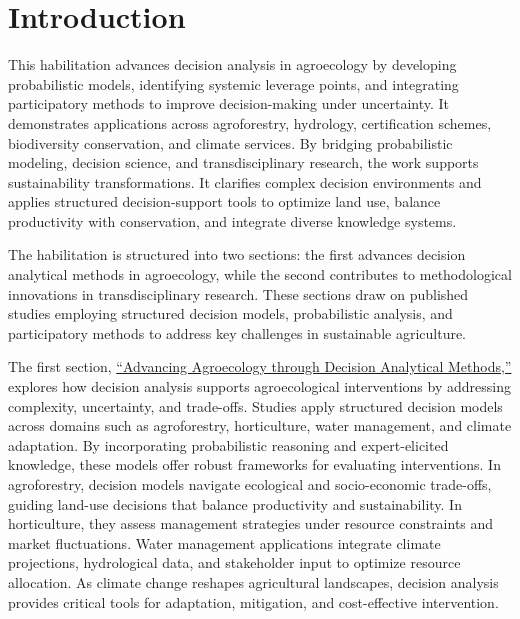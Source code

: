\documentclass[
]{article}
\begin{document}
\renewcommand{\thesection}{\arabic{section}}
\renewcommand{\thesubsection}{\thesection.\arabic{subsection}}

\newpage
{}

\hypertarget{introduction}{%
\section{Introduction}\label{introduction}}

This habilitation advances decision analysis in agroecology by
developing probabilistic models, identifying systemic leverage points,
and integrating participatory methods to improve decision-making under
uncertainty. It demonstrates applications across agroforestry,
hydrology, certification schemes, biodiversity conservation, and climate
services. By bridging probabilistic modeling, decision science, and
transdisciplinary research, the work supports sustainability
transformations. It clarifies complex decision environments and applies
structured decision-support tools to optimize land use, balance
productivity with conservation, and integrate diverse knowledge systems.

The habilitation is structured into two sections: the first advances
decision analytical methods in agroecology, while the second contributes
to methodological innovations in transdisciplinary research. These
sections draw on published studies employing structured decision models,
probabilistic analysis, and participatory methods to address key
challenges in sustainable agriculture.

The first section, \protect\hyperlink{chapter_one}{``Advancing
Agroecology through Decision Analytical Methods,''} explores how
decision analysis supports agroecological interventions by addressing
complexity, uncertainty, and trade-offs. Studies apply structured
decision models across domains such as agroforestry, horticulture, water
management, and climate adaptation. By incorporating probabilistic
reasoning and expert-elicited knowledge, these models offer robust
frameworks for evaluating interventions. In agroforestry, decision
models navigate ecological and socio-economic trade-offs, guiding
land-use decisions that balance productivity and sustainability. In
horticulture, they assess management strategies under resource
constraints and market fluctuations. Water management applications
integrate climate projections, hydrological data, and stakeholder input
to optimize resource allocation. As climate change reshapes agricultural
landscapes, decision analysis provides critical tools for adaptation,
mitigation, and cost-effective intervention.
\end{document}
